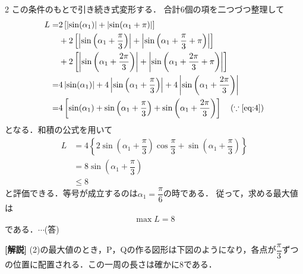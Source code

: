 \documentclass[../../main.tex]{subfiles}
\begin{document}
\begin{multicols}{2}
  この条件のもとで引き続き式変形する．
  合計$6$個の項を二つづつ整理して
  \begin{align}
    L
    = & 2\left[\left|\sin (\alpha_1)\right| + \left|\sin (\alpha_1 + \pi)\right| \right]                                                                                     \\
    & + 2\left[\left|\sin \left(\alpha_1+\dfrac{\pi}{3}\right)\right| + \left|\sin \left(\alpha_1 + \dfrac{\pi}{3} + \pi\right)\right| \right]                               \\
    & + 2\left[\left|\sin \left(\alpha_1+\dfrac{2\pi}{3}\right)\right| + \left|\sin \left(\alpha_1 + \dfrac{2\pi}{3} + \pi\right)\right| \right]                             \\
    = & 4\left|\sin (\alpha_1)\right| + 4\left|\sin \left(\alpha_1+\dfrac{\pi}{3}\right)\right| + 4\left|\sin \left(\alpha_1+\dfrac{2\pi}{3}\right)\right|                     \\
    = & 4\left[\sin (\alpha_1) + \sin \left(\alpha_1+\dfrac{\pi}{3}\right) + \sin \left(\alpha_1+\dfrac{2\pi}{3}\right)\right]      \quad (\because \text{\cref{eq:4}})
  \end{align}
  となる．和積の公式を用いて
  \begin{align}
    L
    & = 4\left\{ 2\sin(\alpha_1 + \dfrac{\pi}{3}) \cos \dfrac{\pi}{3} + \sin(\alpha_1 + \dfrac{\pi}{3}) \right\} \\
    & = 8\sin(\alpha_1 + \dfrac{\pi}{3})                                                                       \\
    & \le 8
  \end{align}
  と評価できる．等号が成立するのは$\alpha_1=\dfrac{\pi}{6}$の時である．
  従って，求める最大値は
  \begin{align}
    \max L = 8
  \end{align}
  である．$\cdots$(答)

  {\bf [解説]}
  (2)の最大値のとき，P，Qの作る図形は下図のようになり，各点が$\dfrac{\pi}{3}$ずつの位置に配置される．この一周の長さは確かに$8$である．


\end{multicols}
\end{document}
